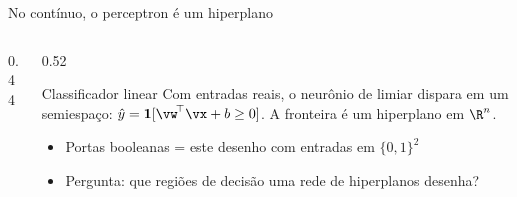 \documentclass[aspectratio=169, 11pt]{beamer}
\begin{document}
\begin{frame}{No contínuo, o perceptron é um hiperplano}

  \begin{columns}[T]
    \begin{column}{0.44\textwidth}
      \begin{center}
      \end{center}
    \end{column}
    \begin{column}{0.52\textwidth}
      \begin{defbox}{Classificador linear}
        Com entradas reais, o neurônio de limiar dispara em um semiespaço:
        $\hat{y} = \mathbf{1}[\vw^{\!\top}\vx + b \ge 0]$. A fronteira é um
        hiperplano em $\R^n$.
      \end{defbox}

      \smallskip
      \begin{itemize}\setlength{\itemsep}{0.2ex}
        \item Portas booleanas = este desenho com entradas em $\{0,1\}^2$
        \item Pergunta: que regiões de decisão uma rede de hiperplanos
              desenha?
      \end{itemize}
    \end{column}
  \end{columns}
\end{frame}
\end{document}
